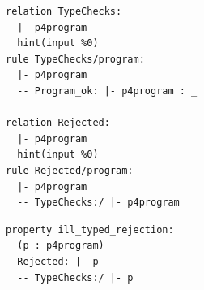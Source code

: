 \begingroup
\setlength{\parindent}{0pt}
\begin{examplerow}
\begin{minipage}[t]{0.5\linewidth}
\vspace{0pt}
\begin{lstlisting}[style=spectecexample,style=examplecolumn]
relation TypeChecks:
  |- p4program
  hint(input %0)
rule TypeChecks/program:
  |- p4program
  -- Program_ok: |- p4program : _

relation Rejected:
  |- p4program
  hint(input %0)
rule Rejected/program:
  |- p4program
  -- TypeChecks:/ |- p4program
\end{lstlisting}
\end{minipage}%
\begin{minipage}[t]{0.5\linewidth}
\vspace{0pt}
\begin{lstlisting}[style=spectecexample,style=examplecolumn]
property ill_typed_rejection:
  (p : p4program)
  Rejected: |- p
  -- TypeChecks:/ |- p
\end{lstlisting}
\end{minipage}
\end{examplerow}
\begin{minipage}[t]{0.5\linewidth}
\end{minipage}%
\begin{minipage}[t]{0.5\linewidth}
\end{minipage}
\endgroup
